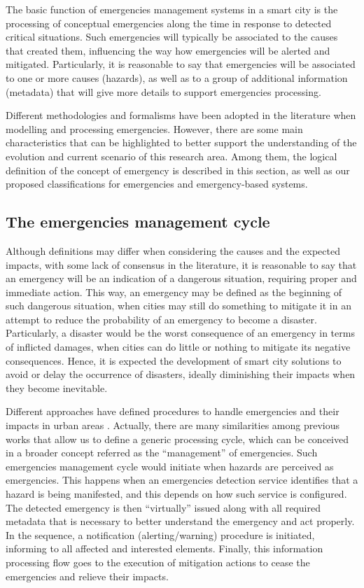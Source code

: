 \begin{refsection}
The basic function of emergencies management systems in a smart city is the processing of conceptual emergencies along the time in response to detected critical situations. Such emergencies will typically be associated to the causes that created them, influencing the way how emergencies will be alerted and mitigated. Particularly, it is reasonable to say that emergencies will be associated to one or more causes (hazards), as well as to a group of additional information (metadata) that will give more details to support emergencies processing.  

Different methodologies and formalisms have been adopted in the literature when modelling and processing emergencies. However, there are some main characteristics that can be highlighted to better support the understanding of the evolution and current scenario of this research area. Among them, the logical definition of the concept of emergency is described in this section, as well as our proposed classifications for emergencies and emergency-based systems.

\subsection{The emergencies management cycle}

Although definitions may differ when considering the causes and the expected impacts, with some lack of consensus in the literature, it is reasonable to say that an emergency will be an indication of a dangerous situation, requiring proper and immediate action. This way, an emergency may be defined as the beginning of such dangerous situation, when cities may still do something to mitigate it in an attempt to reduce the probability of an emergency to become a disaster. Particularly, a disaster would be the worst consequence of an emergency in terms of inflicted damages, when cities can do little or nothing to mitigate its negative consequences. Hence, it is expected the development of smart city solutions to avoid or delay the occurrence of disasters, ideally diminishing their impacts when they become inevitable. 

Different approaches have defined procedures to handle emergencies and their impacts in urban areas \cite{citiesemergencies1,citiesdisasters1,emergenciesmetric2,mobilityEmergencies1,kumar2017emergency}. Actually, there are many similarities among previous works that allow us to define a generic processing cycle, which can be conceived in a broader concept referred as the ``management'' of emergencies. Such emergencies management cycle would initiate when hazards are perceived as emergencies. This happens when an emergencies detection service identifies that a hazard is being manifested, and this depends on how such service is configured. The detected emergency is then ``virtually'' issued along with all required metadata that is necessary to better understand the emergency and act properly. In the sequence, a notification (alerting/warning) procedure is initiated, informing to all affected and interested elements. Finally, this information processing flow goes to the execution of mitigation actions to cease the emergencies and relieve their impacts. 


\end{refsection}
